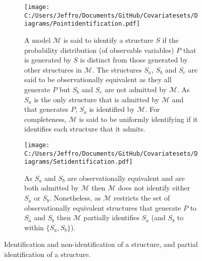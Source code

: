 \documentclass[10pt,a4paper,twoside]{article}
\numberwithin{equation}{section}
\begin{document}
\begin{figure}[p]
\centering
\begin{subfigure}{0.8\textwidth}
  \centering
  \texttt{[image: C:/Users/Jeffro/Documents/GitHub/Covariatesets/Diagrams/Pointidentification.pdf]}
  \caption{A model $\mathcal{M}$ is said to identify a structure $S$ if the probability distribution (of observable variables) $P$ that is generated by $S$ is distinct from those generated by other structures in $\mathcal{M}$. The structures $S_a$, $S_b$ and $S_c$ are said to be observationally equivalent as they all generate $P$ but $S_b$ and $S_c$ are not admitted by $\mathcal{M}$. As $S_a$ is the only structure that is admitted by $\mathcal{M}$ and that generates $P$, $S_a$ is identified by $\mathcal{M}$. For completeness, $\mathcal{M}$ is said to be uniformly identifying if it identifies each structure that it admits.}
  \label{fig:identify}
  \end{subfigure}
  \begin{subfigure}{0.8\textwidth}
  \centering
  \texttt{[image: C:/Users/Jeffro/Documents/GitHub/Covariatesets/Diagrams/Setidentification.pdf]}
  \caption{As $S_a$ and $S_b$ are observationally equivalent and are both admitted by $\mathcal{M}$ then $\mathcal{M}$ does not identify either $S_a$ or $S_b$. Nonetheless, as $\mathcal{M}$ restricts the set of observationally equivalent structures that generate $P$ to $S_a$ and $S_b$ then $\mathcal{M}$ partially identifies $S_a$ (and $S_b$ to within $\lbrace S_a,S_b\rbrace$).}
  \label{fig:partial}
  \end{subfigure}
\caption{Identification and non-identification of a structure, and partial identification of a structure.}
\label{fig:identification}
\end{figure}
\end{document}
